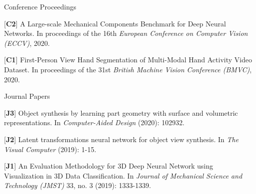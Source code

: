 


\begin{cventries}
\cvpub
{Conference Proceedings} %
{ %
\begin{cvitems}
\item {[\textbf{C2}] A Large-scale Mechanical Components Benchmark for Deep Neural Networks. In proceedings of the 16th \textit{European Conference on Computer Vision (ECCV)}, 2020.}
\item {[\textbf{C1}] First-Person View Hand Segmentation of Multi-Modal Hand Activity Video Dataset. In proceedings of the 31st \textit{British Machine Vision Conference (BMVC)}, 2020.}
\end{cvitems}
}


\cvpub
{Journal Papers} %
{ %
\begin{cvitems}
\item {[\textbf{J3}] Object synthesis by learning part geometry with surface and volumetric representations. In \textit{Computer-Aided Design} (2020): 102932.} 
\item {[\textbf{J2}] Latent transformations neural network for object view synthesis. In \textit{The Visual Computer} (2019): 1-15.}
\item {[\textbf{J1}] An Evaluation Methodology for 3D Deep Neural Network using Visualization in 3D Data Classification. In \textit{Journal of Mechanical Science and Technology (JMST)} 33, no. 3 (2019): 1333-1339.}
\end{cvitems}
}



\end{cventries}
